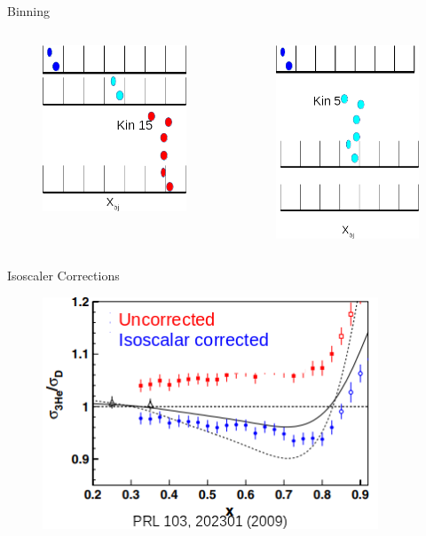 \documentclass{beamer}
\begin{document}
\begin{frame}{Binning}
\begin{columns}
	\begin{figure}
		\includegraphics[width=5cm]{../images/bin_ex_kin15}
	\end{figure}
	
	\begin{figure}
		\includegraphics[width=5cm]{../images/bin_ex_kin5}
	\end{figure}
\end{columns}
\end{frame}

\begin{frame}{Isoscaler Corrections}

	\begin{figure}
		\includegraphics[width=10cm]{../images/iso_cor}
	\end{figure}
	
	
\end{frame}
\end{document}
